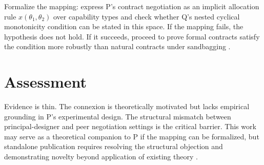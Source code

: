 \documentclass{article}
\begin{document}
Formalize the mapping: express P's contract negotiation as an implicit allocation rule \( x(\theta_1, \theta_2) \) over capability types and check whether Q's nested cyclical monotonicity condition can be stated in this space. If the mapping fails, the hypothesis does not hold. If it succeeds, proceed to prove formal contracts satisfy the condition more robustly than natural contracts under sandbagging .

\section*{Assessment}

Evidence is thin. The connexion is theoretically motivated but lacks empirical grounding in P's experimental design. The structural mismatch between principal-designer and peer negotiation settings is the critical barrier. This work may serve as a theoretical companion to P if the mapping can be formalized, but standalone publication requires resolving the structural objection and demonstrating novelty beyond application of existing theory .
\end{document}

